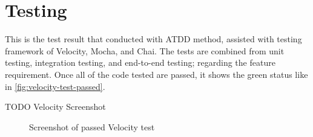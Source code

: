 \section{Testing}
\label{sec:testing}

This is the test result that conducted with \ac{ATDD} method, assisted with testing framework of Velocity, Mocha, and Chai.
The tests are combined from unit testing, integration testing, and end-to-end testing; regarding the feature requirement.
Once all of the code tested are passed, it shows the green status like in \autoref{fig:velocity-test-passed}.

TODO Velocity Screenshot

\begin{figure}[htb]
  \centering
  \caption{Screenshot of passed Velocity test}
  \label{fig:velocity-test}
\end{figure}
